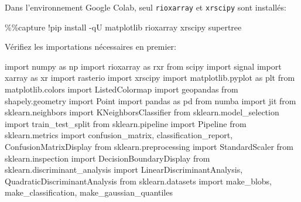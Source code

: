 \documentclass[
  11pt,
  letterpaper,
  open=any,
  twoside=false,
  french]{scrbook}
\newenvironment{Shaded}{\begin{snugshade}}{\end{snugshade}}
\newcommand{\ImportTok}[1]{\textcolor[rgb]{0.00,0.46,0.62}{#1}}
\newcommand{\NormalTok}[1]{\textcolor[rgb]{0.00,0.23,0.31}{#1}}
\newcommand{\OperatorTok}[1]{\textcolor[rgb]{0.37,0.37,0.37}{#1}}
\begin{document}
Dans l'environnement Google Colab, seul \texttt{rioxarray} et
\texttt{xrscipy} sont installés:

\begin{Shaded}
\begin{Highlighting}[]
\OperatorTok{\%\%}\NormalTok{capture}
\OperatorTok{!}\NormalTok{pip install }\OperatorTok{{-}}\NormalTok{qU matplotlib rioxarray xrscipy supertree}
\end{Highlighting}
\end{Shaded}

Vérifiez les importations nécessaires en premier:

\begin{Shaded}
\begin{Highlighting}[]
\ImportTok{import}\NormalTok{ numpy }\ImportTok{as}\NormalTok{ np}
\ImportTok{import}\NormalTok{ rioxarray }\ImportTok{as}\NormalTok{ rxr}
\ImportTok{from}\NormalTok{ scipy }\ImportTok{import}\NormalTok{ signal}
\ImportTok{import}\NormalTok{ xarray }\ImportTok{as}\NormalTok{ xr}
\ImportTok{import}\NormalTok{ rasterio}
\ImportTok{import}\NormalTok{ xrscipy}
\ImportTok{import}\NormalTok{ matplotlib.pyplot }\ImportTok{as}\NormalTok{ plt}
\ImportTok{from}\NormalTok{ matplotlib.colors }\ImportTok{import}\NormalTok{ ListedColormap}
\ImportTok{import}\NormalTok{ geopandas}
\ImportTok{from}\NormalTok{ shapely.geometry }\ImportTok{import}\NormalTok{ Point}
\ImportTok{import}\NormalTok{ pandas }\ImportTok{as}\NormalTok{ pd}
\ImportTok{from}\NormalTok{ numba }\ImportTok{import}\NormalTok{ jit}
\ImportTok{from}\NormalTok{ sklearn.neighbors }\ImportTok{import}\NormalTok{ KNeighborsClassifier}
\ImportTok{from}\NormalTok{ sklearn.model\_selection }\ImportTok{import}\NormalTok{ train\_test\_split}
\ImportTok{from}\NormalTok{ sklearn.pipeline }\ImportTok{import}\NormalTok{ Pipeline}
\ImportTok{from}\NormalTok{ sklearn.metrics }\ImportTok{import}\NormalTok{ confusion\_matrix, classification\_report, ConfusionMatrixDisplay}
\ImportTok{from}\NormalTok{ sklearn.preprocessing }\ImportTok{import}\NormalTok{ StandardScaler}
\ImportTok{from}\NormalTok{ sklearn.inspection }\ImportTok{import}\NormalTok{ DecisionBoundaryDisplay}
\ImportTok{from}\NormalTok{ sklearn.discriminant\_analysis }\ImportTok{import}\NormalTok{ LinearDiscriminantAnalysis, QuadraticDiscriminantAnalysis}
\ImportTok{from}\NormalTok{ sklearn.datasets }\ImportTok{import}\NormalTok{ make\_blobs, make\_classification, make\_gaussian\_quantiles}
\end{Highlighting}
\end{Shaded}
\end{document}

